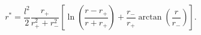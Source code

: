 \begin{equation}
r^*=\frac{l^2}{2}  \frac{r_+}{r_+^2+r_-^2}  [\ln
(\frac{r-r_+}{r+r_+})+  \frac{r_-}{r_+}\arctan (\frac{r}{r_-})].
\end{equation}

